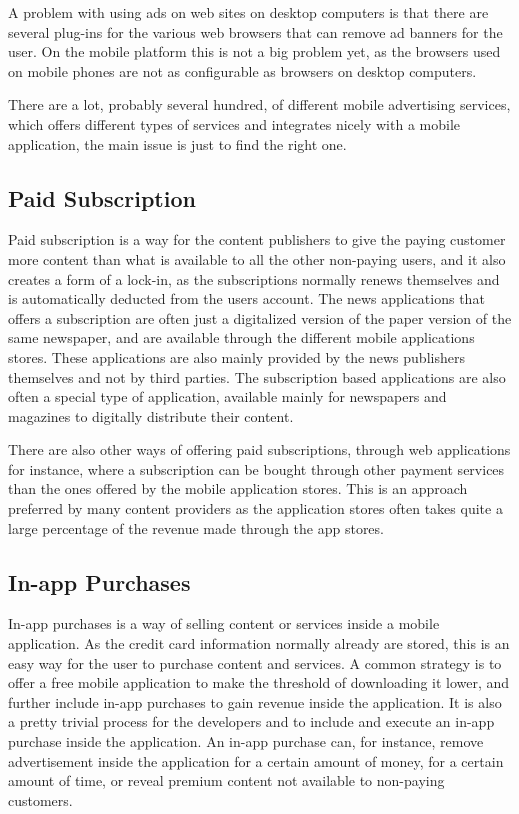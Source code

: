 A problem with using ads on web sites on desktop computers is that there are several plug-ins for the various web browsers that can remove ad banners for the user. On the mobile platform this is not a big problem yet, as the browsers used on mobile phones are not as configurable as browsers on desktop computers.

There are a lot, probably several hundred, of different mobile advertising services, which offers different types of services and integrates nicely with a mobile application, the main issue is just to find the right one.

\subsection{Paid Subscription}
Paid subscription is a way for the content publishers to give the paying customer more content than what is available to all the other non-paying users, and it also creates a form of a lock-in, as the subscriptions normally renews themselves and is automatically deducted from the users account. The news applications that offers a subscription are often just a digitalized version of the paper version of the same newspaper, and are available through the different mobile applications stores. These applications are also mainly provided by the news publishers themselves and not by third parties. The subscription based applications are also often a special type of application, available mainly for newspapers and magazines to digitally distribute their content.

There are also other ways of offering paid subscriptions, through web applications for instance, where a subscription can be bought through other payment services than the ones offered by the mobile application stores. This is an approach preferred by many content providers as the application stores often takes quite a large percentage of the revenue made through the app stores.

\subsection{In-app Purchases}
In-app purchases is a way of selling content or services inside a mobile application. As the credit card information normally already are stored, this is an easy way for the user to purchase content and services. A common strategy is to offer a free mobile application to make the threshold of downloading it lower, and further include in-app purchases to gain revenue inside the application. It is also a pretty trivial process for the developers and to include and execute an in-app purchase inside the application. An in-app purchase can, for instance, remove advertisement inside the application for a certain amount of money, for a certain amount of time, or reveal premium content not available to non-paying customers.

